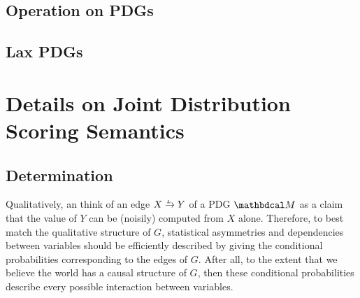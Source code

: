 \documentclass{article}
\begin{document}
	\subsection{Operation on PDGs}
	\subsection{Lax PDGs}
	\section{Details on Joint Distribution Scoring Semantics}\label{sec:details-on-joint-scoring}
	\subsection{Determination}

	Qualitatively, an think of an edge $\ed LXY$ of a PDG $\dg M$ as a claim that the value of $Y$ can be (noisily) computed from
	$X$ alone.  
	Therefore, to best match the qualitative structure of $G$, statistical asymmetries and dependencies between variables should
	be efficiently described by giving the conditional probabilities corresponding to the edges of $G$. After all, to the extent that we believe the world has a causal structure of $G$, then these conditional probabilities describe every possible interaction between variables. 
\end{document}
